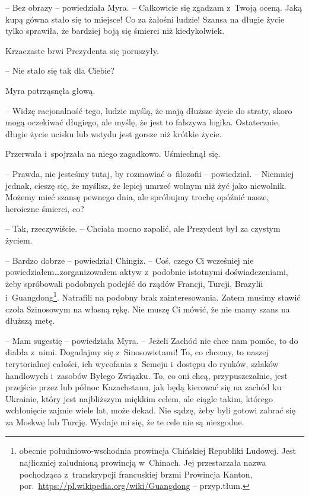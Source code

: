 \documentclass[oneside,polish,11pt,sfheadings]{mwbk}
\begin{document}
-- Bez obrazy -- powiedziała Myra. -- Całkowicie się zgadzam z~Twoją oceną.
Jaką kupą gówna stało się to miejsce! Co za żałośni ludzie! Szansa na
długie życie tylko sprawiła, że bardziej boją się śmierci niż
kiedykolwiek.

Krzaczaste brwi Prezydenta się poruszyły. 

-- Nie stało się tak dla
Ciebie?

Myra potrząsnęła głową. 

-- Widzę racjonalność tego, ludzie myślą, że mają
dłuższe życie do straty, skoro mogą oczekiwać długiego, ale myślę, że
jest to fałszywa logika. Ostatecznie, długie życie ucisku lub wstydu
jest gorsze niż krótkie życie.

Przerwała i~spojrzała na niego zagadkowo. Uśmiechnął się.

-- Prawda, nie jesteśmy tutaj, by rozmawiać o~filozofii -- powiedział. -- Niemniej jednak, cieszę się, że myślisz, że lepiej umrzeć wolnym niż żyć
jako niewolnik. Możemy mieć szansę pewnego dnia, ale spróbujmy trochę
opóźnić nasze, heroiczne śmierci, co?

-- Tak, rzeczywiście. -- Chciała mocno zapalić, ale Prezydent był za
czystym życiem.

-- Bardzo dobrze -- powiedział Chingiz. -- Coś, czego Ci wcześniej nie
powiedziałem\ldots zorganizowałem aktyw z~podobnie istotnymi
doświadczeniami, żeby spróbowali podobnych podejść do rządów Francji,
Turcji, Brazylii i~Guangdong\footnote{ obecnie południowo-wschodnia prowincja
Chińskiej Republiki Ludowej. Jest najliczniej zaludnioną prowincją w~Chinach. Jej przestarzała nazwa pochodząca z~transkrypcji francuskiej
brzmi Prowincja Kanton,
por.~\url{https://pl.wikipedia.org/wiki/Guangdong} -- przyp.tłum.}. Natrafili na podobny brak zainteresowania. Zatem musimy
stawić czoła Szinosowym na własną rękę. Nie muszę Ci mówić, że nie mamy
szans na dłuższą metę.

-- Mam sugestię -- powiedziała Myra. -- Jeżeli Zachód nie chce nam pomóc,
to do diabła z~nimi. Dogadajmy się z~Sinosowietami! To, co chcemy, to
naszej terytorialnej całości, ich wycofania z~Semeju i~dostępu do
rynków, szlaków handlowych i~zasobów Byłego Związku. To, co oni chcą,
przypuszczalnie, jest przejście przez lub północ Kazachstanu, jak będą
kierować się na zachód ku Ukrainie, który jest najbliższym miękkim
celem, ale ciągle takim, którego wchłonięcie zajmie wiele lat, może
dekad. Nie sądzę, żeby byli gotowi zabrać się za Moskwę lub Turcję.
Wydaje mi się, że te cele nie są niezgodne.
\end{document}
